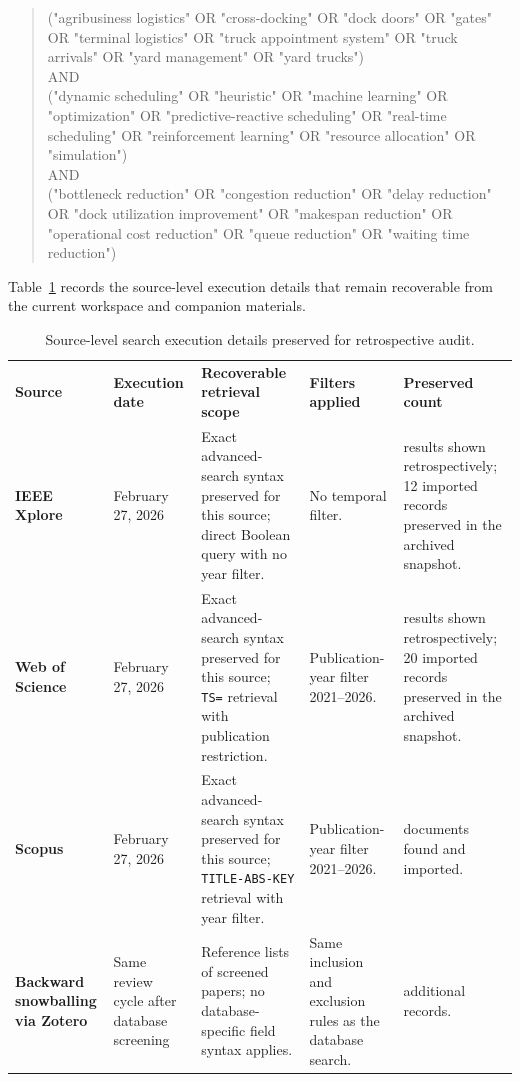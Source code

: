 \documentclass[preprint,12pt,number,longtitle]{elsarticle}
\begin{document}
\begin{quote}
\footnotesize
("agribusiness logistics" OR "cross-docking" OR "dock doors" OR "gates" OR "terminal logistics" OR "truck appointment system" OR "truck arrivals" OR "yard management" OR "yard trucks")\\
AND\\
("dynamic scheduling" OR "heuristic" OR "machine learning" OR "optimization" OR "predictive-reactive scheduling" OR "real-time scheduling" OR "reinforcement learning" OR "resource allocation" OR "simulation")\\
AND\\
("bottleneck reduction" OR "congestion reduction" OR "delay reduction" OR "dock utilization improvement" OR "makespan reduction" OR "operational cost reduction" OR "queue reduction" OR "waiting time reduction")
\end{quote}

Table~\ref{tab:search-audit} records the source-level execution details that remain recoverable from the current workspace and companion materials.

\begin{table}[t]
\caption{Source-level search execution details preserved for retrospective audit.}
\label{tab:search-audit}
\footnotesize
\setlength{\tabcolsep}{4pt}
\renewcommand{\arraystretch}{1.15}
\begin{tabularx}{\textwidth}{>{\raggedright\arraybackslash\bfseries}p{} >{\raggedright\arraybackslash}p{} >{\raggedright\arraybackslash}p{} >{\raggedright\arraybackslash}p{} >{\raggedright\arraybackslash}X}
\rowcolor{tablehead}
\textbf{Source} & \textbf{Execution date} & \textbf{Recoverable retrieval scope} & \textbf{Filters applied} & \textbf{Preserved count} \\
IEEE Xplore & February 27, 2026 & Exact advanced-search syntax preserved for this source; direct Boolean query with no year filter. & No temporal filter. & 13 results shown retrospectively; 12 imported records preserved in the archived snapshot. \\
	Web of Science & February 27, 2026 & Exact advanced-search syntax preserved for this source; \texttt{TS=} retrieval with publication restriction. & Publication-year filter 2021--2026. & 21 results shown retrospectively; 20 imported records preserved in the archived snapshot. \\
Scopus & February 27, 2026 & Exact advanced-search syntax preserved for this source; \texttt{TITLE-ABS-KEY} retrieval with year filter. & Publication-year filter 2021--2026. & 22 documents found and imported. \\
Backward snowballing via Zotero & Same review cycle after database screening & Reference lists of screened papers; no database-specific field syntax applies. & Same inclusion and exclusion rules as the database search. & 8 additional records. \\
\end{tabularx}
\end{table}
\end{document}
